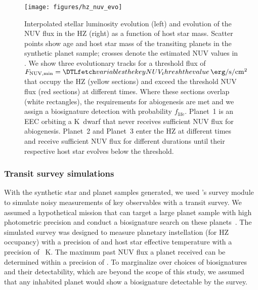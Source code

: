 \documentclass[twocolumn,twocolappendix,linenumbers]{aastex631}
\begin{document}
\begin{figure*}
    \begin{centering}
        \texttt{[image: figures/hz\_nuv\_evo]}
        \caption{Interpolated stellar luminosity evolution (left) and evolution of the \gls{NUV} flux in the \gls{HZ} (right) as a function of host star mass.
        Scatter points show age and host star mass of the transiting planets in the synthetic planet sample; crosses denote the estimated \gls{NUV} values in . %
        We show three evolutionary tracks for a threshold flux of $F_\mathrm{NUV, min} = \var{NUV_thresh}\,\SI{}{\erg\per\second\per\centi\meter\squared}$ that occupy the \gls{HZ} (yellow sections) and exceed the threshold \gls{NUV} flux (red sections) at different times.
        Where these sections overlap (white rectangles), the requirements for abiogenesis are met and we assign a biosignature detection with probability $f_\mathrm{life}$.
        Planet~1 is an \gls{EEC} orbiting a K~dwarf that never receives sufficient \gls{NUV} flux for abiogenesis.
        Planet~2 and Planet~3 enter the \gls{HZ} at different times and receive sufficient \gls{NUV} flux for different durations until their respective host star evolves below the threshold.
        }
        \label{fig:hz_nuv_evo}
    \end{centering}
\end{figure*}



\subsubsection{Transit survey simulations}
With the synthetic star and planet samples generated, we used \bioverse's survey module to simulate noisy measurements of key observables with a transit survey.
We assumed a hypothetical mission that can target a large planet sample with high photometric precision and conduct a biosignature search on these planets~\citep[e.g.,][]{Apai2019,Apai2022}.
The simulated survey was designed to measure planetary instellation (for \gls{HZ} occupancy) with a precision of  and host star effective temperature with a precision of ~K.
The maximum past \gls{NUV} flux a planet received can be determined within a precision of .
To marginalize over choices of biosignatures and their detectability, which are beyond the scope of this study, we assumed that any inhabited planet would show a biosignature detectable by the survey.
\end{document}
